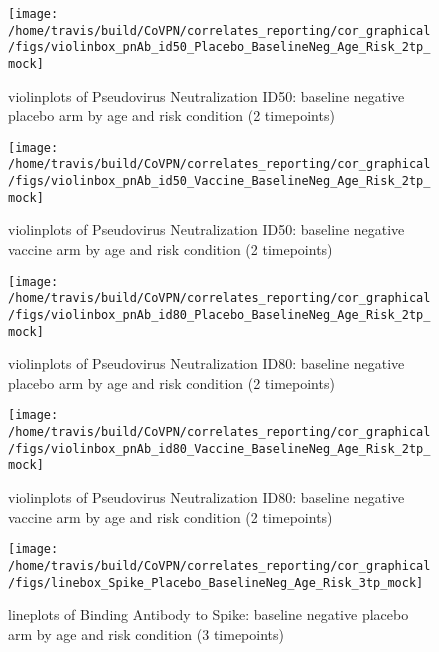\documentclass[]{book}
\theoremstyle{definition}
\theoremstyle{definition}
\theoremstyle{definition}
\newcommand{\1}{\mathbbm{1}}
\begin{document}
\clearpage
\begin{figure}[H]

{\centering \texttt{[image: /home/travis/build/CoVPN/correlates\_reporting/cor\_graphical/figs/violinbox\_pnAb\_id50\_Placebo\_BaselineNeg\_Age\_Risk\_2tp\_mock]} 

}

\caption{violinplots of Pseudovirus Neutralization ID50: baseline negative placebo arm by age and risk condition (2 timepoints)}\label{fig:unnamed-chunk-135}
\end{figure}

\clearpage
\begin{figure}[H]

{\centering \texttt{[image: /home/travis/build/CoVPN/correlates\_reporting/cor\_graphical/figs/violinbox\_pnAb\_id50\_Vaccine\_BaselineNeg\_Age\_Risk\_2tp\_mock]} 

}

\caption{violinplots of Pseudovirus Neutralization ID50: baseline negative vaccine arm by age and risk condition (2 timepoints)}\label{fig:unnamed-chunk-136}
\end{figure}

\clearpage
\begin{figure}[H]

{\centering \texttt{[image: /home/travis/build/CoVPN/correlates\_reporting/cor\_graphical/figs/violinbox\_pnAb\_id80\_Placebo\_BaselineNeg\_Age\_Risk\_2tp\_mock]} 

}

\caption{violinplots of Pseudovirus Neutralization ID80: baseline negative placebo arm by age and risk condition (2 timepoints)}\label{fig:unnamed-chunk-137}
\end{figure}

\clearpage
\begin{figure}[H]

{\centering \texttt{[image: /home/travis/build/CoVPN/correlates\_reporting/cor\_graphical/figs/violinbox\_pnAb\_id80\_Vaccine\_BaselineNeg\_Age\_Risk\_2tp\_mock]} 

}

\caption{violinplots of Pseudovirus Neutralization ID80: baseline negative vaccine arm by age and risk condition (2 timepoints)}\label{fig:unnamed-chunk-138}
\end{figure}

\clearpage
\begin{figure}[H]

{\centering \texttt{[image: /home/travis/build/CoVPN/correlates\_reporting/cor\_graphical/figs/linebox\_Spike\_Placebo\_BaselineNeg\_Age\_Risk\_3tp\_mock]} 

}

\caption{lineplots of Binding Antibody to Spike: baseline negative placebo arm by age and risk condition (3 timepoints)}\label{fig:unnamed-chunk-139}
\end{figure}
\end{document}
